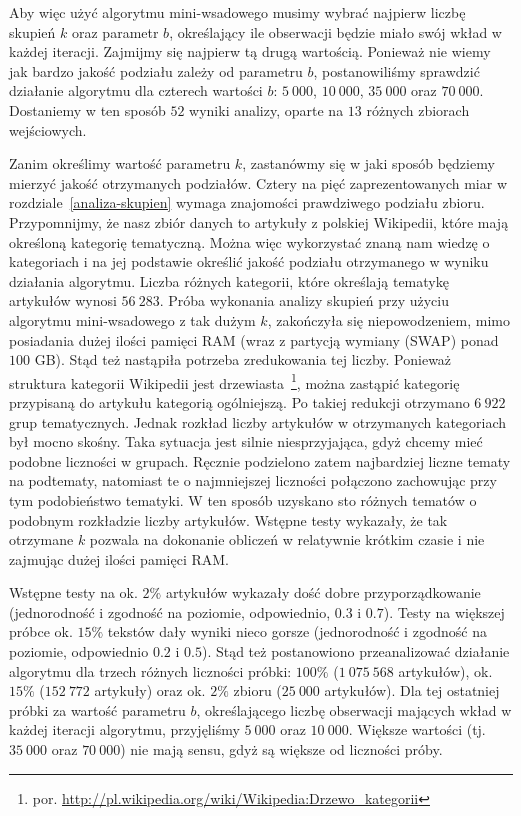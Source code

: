 \documentclass{praca1}
\begin{document}
Aby więc użyć algorytmu mini-wsadowego musimy wybrać najpierw liczbę skupień $k$ oraz parametr $b$, określający ile obserwacji będzie miało swój wkład w każdej iteracji. Zajmijmy się najpierw tą drugą wartością. Ponieważ nie wiemy jak bardzo jakość podziału zależy od parametru $b$, postanowiliśmy sprawdzić działanie algorytmu dla czterech wartości $b$: $5\ 000$, $10\ 000$, $35\ 000$ oraz $70\ 000$. Dostaniemy w ten sposób $52$ wyniki analizy, oparte na $13$ różnych zbiorach wejściowych.

Zanim określimy wartość parametru $k$, zastanówmy się w jaki sposób będziemy mierzyć jakość otrzymanych podziałów. Cztery na pięć zaprezentowanych miar w rozdziale~\ref{analiza-skupien} wymaga znajomości prawdziwego podziału zbioru. Przypomnijmy, że nasz zbiór danych to artykuły z polskiej Wikipedii, które mają określoną kategorię tematyczną. Można więc wykorzystać znaną nam wiedzę o kategoriach i na jej podstawie określić jakość podziału otrzymanego w wyniku działania algorytmu. Liczba różnych kategorii, które określają tematykę artykułów wynosi $56\ 283$. Próba wykonania analizy skupień przy użyciu algorytmu mini-wsadowego z tak dużym $k$, zakończyła się niepowodzeniem, mimo posiadania dużej ilości pamięci RAM (wraz z partycją wymiany (SWAP) ponad $100$ GB). Stąd też nastąpiła potrzeba zredukowania tej liczby. Ponieważ struktura kategorii Wikipedii jest drzewiasta~\footnote{por. \url{http://pl.wikipedia.org/wiki/Wikipedia:Drzewo_kategorii}}, można zastąpić kategorię przypisaną do artykułu kategorią ogólniejszą. Po takiej redukcji otrzymano $6\ 922$ grup tematycznych. Jednak rozkład liczby artykułów w otrzymanych kategoriach był mocno skośny. Taka sytuacja jest silnie niesprzyjająca, gdyż chcemy mieć podobne liczności w grupach. Ręcznie podzielono zatem najbardziej liczne tematy na podtematy, natomiast te o najmniejszej liczności połączono zachowując przy tym podobieństwo tematyki. W ten sposób uzyskano sto różnych tematów o podobnym rozkładzie liczby artykułów. Wstępne testy wykazały, że tak otrzymane $k$ pozwala na dokonanie obliczeń w relatywnie krótkim czasie i nie zajmując dużej ilości pamięci RAM.

Wstępne testy na ok. $2\%$ artykułów wykazały dość dobre przyporządkowanie (jednorodność i zgodność na poziomie, odpowiednio, $0.3$ i $0.7$). Testy na większej próbce ok. $15\%$ tekstów dały wyniki nieco gorsze (jednorodność i zgodność na poziomie, odpowiednio $0.2$ i $0.5$). Stąd też postanowiono przeanalizować działanie algorytmu dla trzech różnych liczności próbki: $100\%$ ($1\ 075\ 568$ artykułów), ok. $15\%$ ($152\ 772$ artykuły) oraz ok. $2\%$ zbioru ($25\ 000$ artykułów). Dla tej ostatniej próbki za wartość parametru $b$, określającego liczbę obserwacji mających wkład w każdej iteracji algorytmu, przyjęliśmy $5\ 000$ oraz $10\ 000$. Większe wartości (tj. $35\ 000$ oraz $70\ 000$) nie mają sensu, gdyż są większe od liczności próby.
\end{document}
